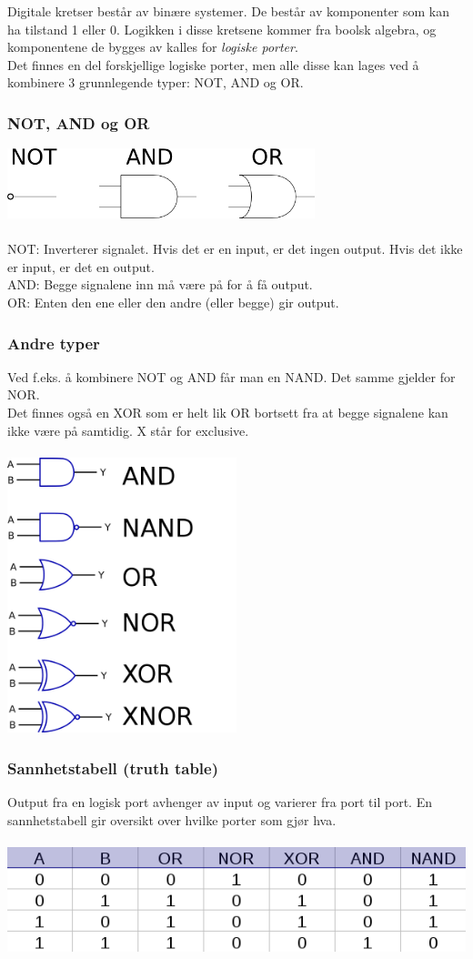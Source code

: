Digitale kretser består av binære systemer.
De består av komponenter som kan ha tilstand 1 eller 0.
Logikken i disse kretsene kommer fra boolsk algebra,
og komponentene de bygges av kalles for \emph{logiske porter}.
\\
Det finnes en del forskjellige logiske porter, men alle disse kan lages
ved å kombinere 3 grunnlegende typer:
NOT, AND og OR.



\subsubsection{NOT, AND og OR}
\includegraphics[width=0.67\textwidth]{./img/notandor}
\\\\
NOT: Inverterer signalet.
     Hvis det er en input, er det ingen output.
     Hvis det ikke er input, er det en output.
\\
AND: Begge signalene inn må være på for å få output.
\\
OR:  Enten den ene eller den andre (eller begge) gir output.



\subsubsection{Andre typer}
Ved f.eks. å kombinere NOT og AND får man en NAND.
Det samme gjelder for NOR.
\\
Det finnes også en XOR som er helt lik OR bortsett fra at
begge signalene kan ikke være på samtidig.
X står for exclusive.
\\\\
\includegraphics[width=0.5\textwidth]{./img/gatesymbols}



\subsubsection{Sannhetstabell (truth table)}
Output fra en logisk port avhenger av input og varierer fra port til port.
En sannhetstabell gir oversikt over hvilke porter som gjør hva.
\\\\
\includegraphics[width=\textwidth]{./img/truthtable}
